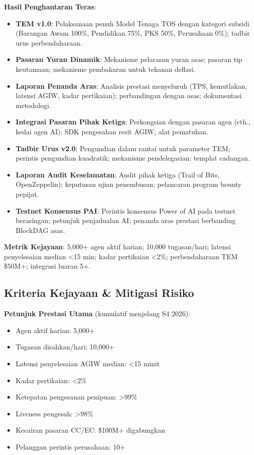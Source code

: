 \documentclass[11pt]{article}
\begin{document}
\textbf{Hasil Penghantaran Teras}:
\begin{itemize}[noitemsep]
  \item \textbf{TEM v1.0}: Pelaksanaan penuh Model Tenaga TOS dengan kategori subsidi (Barangan Awam 100\%, Pendidikan 75\%, PKS 50\%, Perusahaan 0\%); tadbir urus perbendaharaan.
  \item \textbf{Pasaran Yuran Dinamik}: Mekanisme pelarasan yuran asas; pasaran tip keutamaan; mekanisme pembakaran untuk tekanan deflasi.
  \item \textbf{Laporan Penanda Aras}: Analisis prestasi menyeluruh (TPS, kemutlakan, latensi AGIW, kadar pertikaian); perbandingan dengan asas; dokumentasi metodologi.
  \item \textbf{Integrasi Pasaran Pihak Ketiga}: Perkongsian dengan pasaran agen (cth., kedai agen AI); SDK pengesahan resit AGIW; alat pematuhan.
  \item \textbf{Tadbir Urus v2.0}: Pengundian dalam rantai untuk parameter TEM; perintis pengundian kuadratik; mekanisme pendelegasian; templat cadangan.
  \item \textbf{Laporan Audit Keselamatan}: Audit pihak ketiga (Trail of Bits, OpenZeppelin); keputusan ujian penembusan; pelancaran program bounty pepijat.
  \item \textbf{Testnet Konsensus PAI}: Perintis konsensus Power of AI pada testnet berasingan; petunjuk penjadualan AI; penanda aras prestasi berbanding BlockDAG asas.
\end{itemize}

\textbf{Metrik Kejayaan}: 5,000+ agen aktif harian; 10,000 tugasan/hari; latensi penyelesaian median <15 min; kadar pertikaian <2\%; perbendaharaan TEM \$50M+; integrasi luaran 5+.

\subsection{Kriteria Kejayaan \& Mitigasi Risiko}

\textbf{Petunjuk Prestasi Utama} (kumulatif menjelang S4 2026):
\begin{itemize}[noitemsep]
  \item Agen aktif harian: 5,000+
  \item Tugasan disahkan/hari: 10,000+
  \item Latensi penyelesaian AGIW median: <15 minit
  \item Kadar pertikaian: <2\%
  \item Ketepatan pengesanan penipuan: >99\%
  \item Liveness pengesah: >98\%
  \item Kecairan pasaran CC/EC: \$100M+ digabungkan
  \item Pelanggan perintis perusahaan: 10+
\end{itemize}
\end{document}
